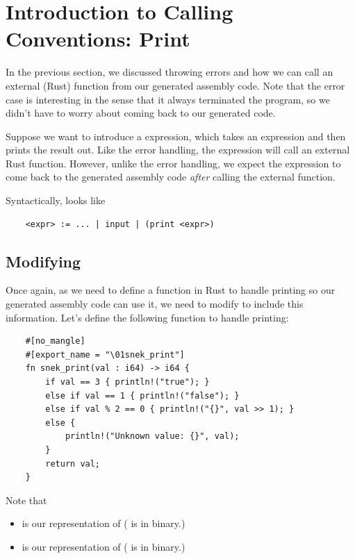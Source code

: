 \section{Introduction to Calling Conventions: Print}
In the previous section, we discussed throwing errors and how we can call an external (Rust) function from our generated assembly code. Note that the error case is interesting in the sense that it always terminated the program, so we didn't have to worry about coming back to our generated code.

\bigskip 

Suppose we want to introduce a  expression, which takes an expression and then prints the result out. Like the error handling, the  expression will call an external Rust function. However, unlike the error handling, we expect the  expression to come back to the generated assembly code \emph{after} calling the external function.

\bigskip 

Syntactically,  looks like 
\begin{verbatim}
    <expr> := ... | input | (print <expr>)\end{verbatim}

\subsection{Modifying }
Once again, as we need to define a function in Rust to handle printing so our generated assembly code can use it, we need to modify  to include this information. Let's define the following function to handle printing: 
\begin{verbatim}
    #[no_mangle]
    #[export_name = "\01snek_print"]
    fn snek_print(val : i64) -> i64 {
        if val == 3 { println!("true"); }
        else if val == 1 { println!("false"); }
        else if val % 2 == 0 { println!("{}", val >> 1); }
        else {
            println!("Unknown value: {}", val);
        }
        return val;
    }\end{verbatim}
Note that 
\begin{itemize}
    \item {} is our representation of  ( is  in binary.)
    \item {} is our representation of  ( is  in binary.)
\end{itemize}

